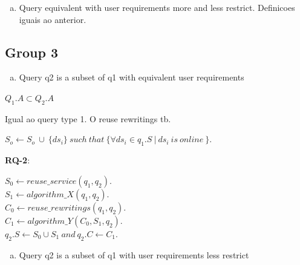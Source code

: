 \begin{enumerate}[b)]
\item Query equivalent with user requirements more and less restrict. Definicoes iguais ao anterior.
\end{enumerate}

\subsection{Group 3}

\begin{enumerate}[a)]
\item Query q2 is a subset of q1 with equivalent user requirements
\end{enumerate}

\begin{definition}
$Q_{1}.A \subset Q_{2}.A$
\end{definition}

\begin{definition}\label{def:??}
Igual ao query type 1. O reuse rewritings tb.
\begin{center}
$ S_{o} \leftarrow S_{o} \ \cup \ \lbrace ds_{i} \rbrace\ such\ that\ \lbrace \forall ds_{i} \in q_{1}.S \ \vert \ ds_{i} \ is \ online\ \rbrace$.
\end{center}
\end{definition}

\begin{definition}
\textbf{RQ-2}:
\begin{flushleft}
$ S_{0} \leftarrow reuse\_service (q_{1}, q_{2})$. \\
$ S_{1} \leftarrow algorithm\_X (q_{1}, q_{2})$. \\
$ C_{0} \leftarrow reuse\_rewritings (q_{1}, q_{2})$. \\
$ C_{1} \leftarrow algorithm\_Y (C_{0}, S_{1}, q_{2})$. \\
$ q_{2}.S \leftarrow S_{0} \cup S_{1}\ and\ q_{2}.C \leftarrow C_{1}$.
\end{flushleft}
\end{definition}

\begin{enumerate}[b)]
\item Query q2 is a subset of q1 with user requirements less restrict
\end{enumerate}


